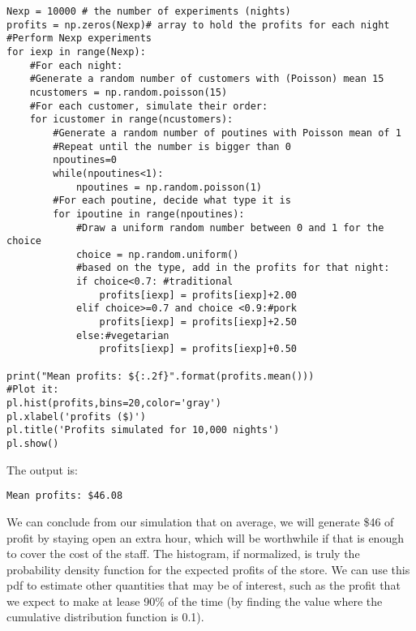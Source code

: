 \begin{lstlisting}[frame=single] 
Nexp = 10000 # the number of experiments (nights)
profits = np.zeros(Nexp)# array to hold the profits for each night
#Perform Nexp experiments
for iexp in range(Nexp):
    #For each night:
    #Generate a random number of customers with (Poisson) mean 15
    ncustomers = np.random.poisson(15)
    #For each customer, simulate their order:
    for icustomer in range(ncustomers):
        #Generate a random number of poutines with Poisson mean of 1
        #Repeat until the number is bigger than 0
        npoutines=0
        while(npoutines<1):
            npoutines = np.random.poisson(1)
        #For each poutine, decide what type it is
        for ipoutine in range(npoutines):
            #Draw a uniform random number between 0 and 1 for the choice
            choice = np.random.uniform()
            #based on the type, add in the profits for that night:
            if choice<0.7: #traditional
                profits[iexp] = profits[iexp]+2.00 
            elif choice>=0.7 and choice <0.9:#pork
                profits[iexp] = profits[iexp]+2.50 
            else:#vegetarian
                profits[iexp] = profits[iexp]+0.50
                
print("Mean profits: ${:.2f}".format(profits.mean())) 
#Plot it:
pl.hist(profits,bins=20,color='gray')
pl.xlabel('profits ($)')
pl.title('Profits simulated for 10,000 nights')
pl.show()
\end{lstlisting}
The output is:
\begin{verbatim}
Mean profits: $46.08
\end{verbatim}

We can conclude from our simulation that on average, we will generate \$46 of profit by staying open an extra hour, which will be worthwhile if that is enough to cover the cost of the staff. The histogram, if normalized, is truly the probability density function for the expected profits of the store. We can use this pdf to estimate other quantities that may be of interest, such as the profit that we expect to make at lease 90\% of the time (by finding the value where the cumulative distribution function is 0.1). 

